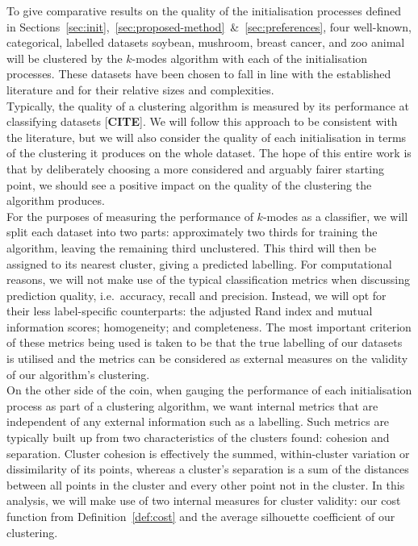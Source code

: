 To give comparative results on the quality of the initialisation processes 
defined in
Sections~\ref{sec:init},~\ref{sec:proposed-method}~\&~\ref{sec:preferences},
four well-known, categorical, labelled datasets \- soybean, mushroom, breast
cancer, and zoo animal \- will be clustered by the \(k\)-modes algorithm with
each of the initialisation processes. These datasets have been chosen to fall in
line with the established literature and for their relative sizes and
complexities.\\

Typically, the quality of a clustering algorithm is measured by its performance
at classifying datasets [\textbf{CITE}]. We will follow this approach to be
consistent with the literature, but we will also consider the quality of each
initialisation in terms of the clustering it produces on the whole dataset. The
hope of this entire work is that by deliberately choosing a more considered and
arguably fairer starting point, we should see a positive impact on the quality
of the clustering the algorithm produces.\\

For the purposes of measuring the performance of \(k\)-modes as a classifier, we
will split each dataset into two parts: approximately two thirds for training
the algorithm, leaving the remaining third unclustered. This third will then be
assigned to its nearest cluster, giving a predicted labelling. For computational
reasons, we will not make use of the typical classification metrics when
discussing prediction quality, i.e.\ accuracy, recall and precision. Instead, we
will opt for their less label-specific counterparts: the adjusted Rand index and
mutual information scores; homogeneity; and completeness. The most important
criterion of these metrics being used is taken to be that the true labelling of
our datasets is utilised and the metrics can be considered as external measures
on the validity of our algorithm's clustering.\\

On the other side of the coin, when gauging the performance of each
initialisation process as part of a clustering algorithm, we want internal
metrics that are independent of any external information such as a labelling.
Such metrics are typically built up from two characteristics of the clusters
found: cohesion and separation. Cluster cohesion is effectively the summed,
within-cluster variation or dissimilarity of its points, whereas a cluster's
separation is a sum of the distances between all points in the cluster and every
other point not in the cluster. In this analysis, we will make use of two
internal measures for cluster validity: our cost function from
Definition~\ref{def:cost} and the average silhouette coefficient of our
clustering.

